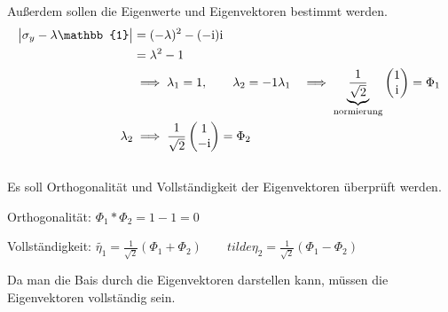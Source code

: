 Außerdem sollen die Eigenwerte und Eigenvektoren bestimmt werden.
\begin{align*}
    \abs{\sigma_y-\lambda\mathbb{1}} &= (-\lambda)^2-(-\ii)\ii \\
                                    &= \lambda^2-1 \\
                                    &\implies \lambda_1 =1, \qquad \lambda_2 = -1
    \lambda_1 &\implies \underbrace{\frac{1}{\sqrt{2}}}_\text{normierung}\begin{pmatrix}
        1 \\ \ii
    \end{pmatrix} = \Phi_1\\
    \lambda_2 &\implies \frac 1{\sqrt 2}\begin{pmatrix}
        1 \\ -\ii
    \end{pmatrix} = \Phi_2
\end{align*}

\subsection{}
Es soll Orthogonalität und Vollständigkeit der Eigenvektoren überprüft werden.

Orthogonalität: $\Phi_1*\Phi_2 = 1-1 = 0$

Vollständigkeit: $\tilde{\eta_1} = \frac 1{\sqrt 2}(\Phi_1 +\Phi_2) \qquad tilde{\eta_2} = \frac 1{\sqrt 2}(\Phi_1 -\Phi_2) $

Da man die Bais durch die Eigenvektoren darstellen kann, müssen die Eigenvektoren vollständig sein.


